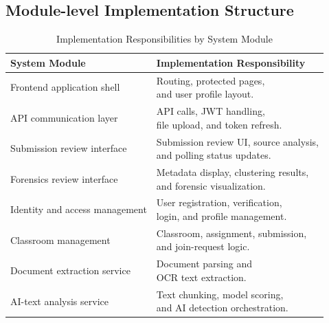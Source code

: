 \documentclass[12pt, a4paper]{report}
\numberwithin{equation}{chapter}
\begin{document}
\subsection{Module-level Implementation Structure}
\begin{table}[H]
    \centering
    \small
    \caption{Implementation Responsibilities by System Module}
    \label{tab:implementation-responsibilities}
    \renewcommand{\arraystretch}{1.65}
    \setlength{\extrarowheight}{3pt}

    \begin{tabularx}{\textwidth}{|>{\raggedright\arraybackslash}p{7.5cm}|X|}
        \hline
        \textbf{System Module} & \textbf{Implementation Responsibility} \\
        \hline

        Frontend application shell & \shortstack[l]{Routing, protected pages,\\and user profile layout.} \\
        \hline

        API communication layer & \shortstack[l]{API calls, JWT handling,\\file upload, and token refresh.} \\
        \hline

        Submission review interface & \shortstack[l]{Submission review UI, source analysis,\\and polling status updates.} \\
        \hline

        Forensics review interface & \shortstack[l]{Metadata display, clustering results,\\and forensic visualization.} \\
        \hline

        Identity and access management & \shortstack[l]{User registration, verification,\\login, and profile management.} \\
        \hline

        Classroom management & \shortstack[l]{Classroom, assignment, submission,\\and join-request logic.} \\
        \hline

        Document extraction service & \shortstack[l]{Document parsing and\\OCR text extraction.} \\
        \hline

        AI-text analysis service & \shortstack[l]{Text chunking, model scoring,\\and AI detection orchestration.} \\
        \hline


\end{tabularx}
\end{table}
\end{document}
